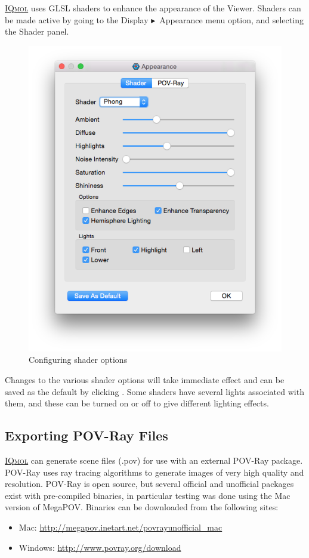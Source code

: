 \documentclass[a4paper,12pt]{article}
\newcommand{\iqmol}{\href{http://iqmol.org}{{\scshape IQmol}}}
\newcommand{\bt}{\ensuremath{\blacktriangleright}}
\begin{document}
\iqmol{} uses GLSL shaders to enhance the appearance of the Viewer.  Shaders can
be made active by going to the Display \bt\ Appearance menu option, and selecting
the Shader panel.
\begin{figure}[h]
\begin{center}
\includegraphics[scale=0.20]{figures/ShaderDialog.png}
\caption{Configuring shader options}
\end{center}
\end{figure}

Changes to the various shader options will take immediate effect and can be saved 
as the default by clicking .  Some shaders have several
lights associated with them, and these can be turned on or off to give different
lighting effects.


\subsection{Exporting POV-Ray Files}

\iqmol{} can generate scene files (.pov) for use with an external POV-Ray package.
POV-Ray uses ray tracing algorithms to generate images of very high quality and
resolution.  POV-Ray is open source, but several official and unofficial
packages exist with pre-compiled binaries, in particular testing was done using
the Mac version of MegaPOV.  Binaries can be downloaded from the
following sites:
\begin{itemize}
\itemsep0em
\item Mac: \url{http://megapov.inetart.net/povrayunofficial_mac}
\item Windows: \url{http://www.povray.org/download}
\end{itemize}
\end{document}
